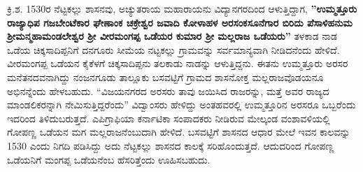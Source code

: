 ಕ್ರಿ.ಶ. 1530ರ ನೆಟ್ಟಕಲ್ಲು ಶಾಸನವು, ಅಚ್ಯುತರಾಯ ಮಹಾರಾಯನು ವಿದ್ಯಾನಗರದಿಂದ ಆಳುತ್ತಿದ್ದಾಗ, \textbf{''ಉಮ್ಮತ್ತೂರು ರಾಜ್ಯಾಧಿಪ ಗಜಬೇಂಟೆಕಾರ ಘೇಣಾಂಕ ಚಕ್ರೇಶ್ವರ ಜವಾದಿ ಕೋಳಾಹಳ ಅರಸಂಕಸೂನೆಗಾರ ಬಿರಿದು\general{\break } ಪೆಸಾಳಿಹನುಮ ಶ‍್ರೀಮನ್ಮಹಾಮಂಡಲೇಶ್ವರ ಶ‍್ರೀ ವೀರಮಂಗಪ್ಪ ಒಡೆಯರ ಕುಮಾರ ಶ‍್ರೀ ಮಲ್ಲರಾಜ ಒಡೆಯರು''} ತಳಕಾಡ ನಾಡ ಒಡೆಯ ಚಿಕ್ಕಸಾದಿಪ್ಪನಿಗೆ ದನಗೂರು ಸೀಮೆಯ ನಟ್ಟಕಲ್ಲು ಗ್ರಾಮವನ್ನು ಸರ್ವಮಾನ್ಯವಾಗಿ ನೀಡಿದನೆಂದು ಹೇಳಿದೆ. ವೀರಮಂಗಪ್ಪ ಒಡೆಯನ ಕೈಕೆಳಗೆ ಚಿಕ್ಕಸಾದಿಪ್ಪನು ತಲಕಾಡು ನಾಡನ್ನು ಆಳುತ್ತಿದ್ದನು. ಈತನು ಉಮ್ಮತ್ತೂರು ಅರಸರ ಮನೆತನದವನಾಗಿದ್ದು ನಂಜನಗೂಡು ತಾಲ್ಲೂಕು ಬಸವಟ್ಟಿಗೆ ಗ್ರಾಮದ ಶಾಸನೋಕ್ತ ಮಲ್ಲರಾಜವೊಡಯನೂ ಅಭಿನನ್ನೆಂದು ಹೇಳಬಹುದು. “ವಿಜಯನಗರದ ಅರಸರು ತಾವು ಜಯಿಸಿದ ರಾಜರನ್ನು, ಮತ್ತೆ ಅವರ ರಾಜ್ಯದ ಮಾಂಡಲಿಕರನ್ನಾಗಿ ನೇಮಿಸುತ್ತಿದ್ದರೆಂದು” ವಿದ್ವಾಂಸರು ಹೇಳಿದ್ದು ಅಂತಹವರಲ್ಲಿ ಉಮ್ಮತ್ತೂರಿನ ಅರಸರೂ ಒಬ್ಬರೆಂದು ಇದರಿಂದ ತಿಳಿದು\-ಬರುತ್ತದೆ. ಎಪಿಗ್ರಾಫಿಯಾ ಕರ್ನಾಟಿಕಾ ಸಂಪಾದಕರು ನೀಡಿರುವ ಮೇಲ್ಕಂಡ ವಂಶಾವಳಿಯಲ್ಲಿ ಗೋಪಣ್ಣ ಒಡೆಯನ ಮಗ ಮಲ್ಲರಾಜ\-ನೆಂಬುದಾಗಿ ಹೇಳಿದೆ. ಬಸವಟ್ಟಿಗೆ ಶಾಸನದ ಆಧಾರ ಮೇಲೆ ಇವನ ಕಾಲವನ್ನು 1530 ಎಂದು ನಿಗದಿ ಪಡಿಸಿದ್ದು ಅದು ನೆಟ್ಟಕಲ್ಲು ಶಾಸನದ ಕಾಲಕ್ಕೆ ಸರಿಹೊಂದುತ್ತದೆ. ಆದುದರಿಂದ ಗೋಪಣ್ಣ ಒಡೆಯನಿಗೆ ಮಂಗಪ್ಪ ಒಡೆಯನೆಂಬ ಹೆಸರಿತ್ತೆಂದು ಊಹಿಸಬಹುದು.

